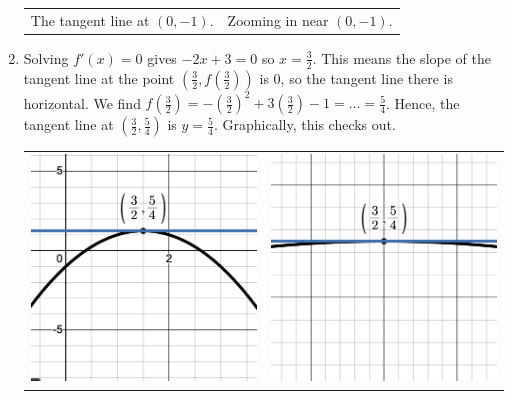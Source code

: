 \documentclass{ximera}
\begin{document}
\begin{ex}
\begin{enumerate}
\begin{center}
\begin{tabular}{cc}
 The tangent line at $(0,-1)$. & Zooming in near $(0, -1)$.  \\
 
 \end{tabular}
 
 \end{center}
 
 \item  Solving $f'(x) = 0$ gives $-2x+3 = 0$ so $x = \frac{3}{2}$.  This means the slope of the tangent line at the point $\left(\frac{3}{2}, f\left(\frac{3}{2}\right) \right)$ is $0$, so the tangent line there is horizontal.  We find 
 $f\left(\frac{3}{2}\right) = -\left( \frac{3}{2}\right)^2 + 3\left(\frac{3}{2}\right) - 1 = \ldots = \frac{5}{4}$.  Hence, the tangent line at  $\left(\frac{3}{2}, \frac{5}{4} \right)$ is $y = \frac{5}{4}$.  Graphically, this checks out.
 
 
 
\begin{center}

\begin{tabular}{cc}

 \includegraphics[width=3in]{./IntroductiontoDerivativesGraphics/HTL.png} &  \includegraphics[width=3in]{./IntroductiontoDerivativesGraphics/HTLZoom.png}  \\
 

\end{tabular}
\end{center}
\end{enumerate}
\end{ex}
\end{document}
